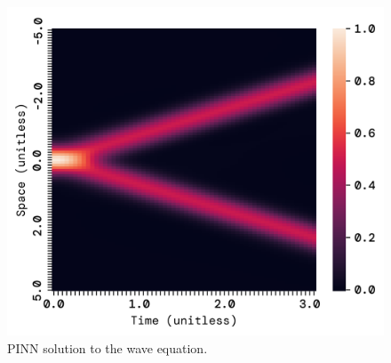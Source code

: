 \documentclass[twoside,11pt]{report}
\begin{document}
    \begin{figure}[!ht]
        \begin{minipage}[t]{0.5\textwidth - 1mm}
            \begin{center}
                \includegraphics[width=\textwidth]{../runsAndFigures/wave_tf_pinn.png}
            \end{center}
            \caption
            {
                PINN solution to the wave equation.
            }\label{fig:wave_own_dnn}
        \end{minipage}
        \hspace{2mm}
        \begin{minipage}[t]{0.5\textwidth - 1mm}
            \begin{center}

\end{center}
\end{minipage}
\end{figure}
\end{document}
